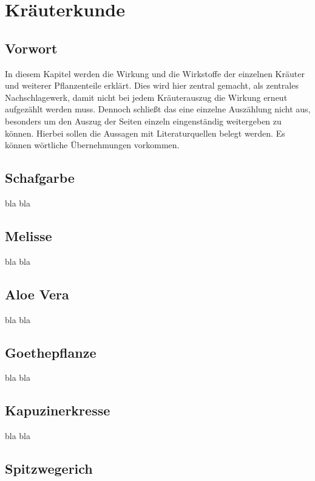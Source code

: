 \chapter{Kräuterkunde}

\section{Vorwort}

In diesem Kapitel werden die Wirkung und die Wirkstoffe der einzelnen Kräuter und weiterer Pflanzenteile erklärt. Dies wird hier zentral gemacht, als zentrales Nachschlagewerk, damit nicht bei jedem Kräuterauszug die Wirkung erneut aufgezählt werden muss. Dennoch schließt das eine einzelne Auszählung nicht aus, besonders um den Auszug der Seiten einzeln eingenständig weitergeben zu können. Hierbei sollen die Aussagen mit Literaturquellen belegt werden. Es können wörtliche Übernehmungen vorkommen.



\section{Schafgarbe}

bla bla

\section{Melisse}

bla bla

\section{Aloe Vera}

bla bla

\section{Goethepflanze}

bla bla

\section{Kapuzinerkresse}

bla bla

\section{Spitzwegerich}

